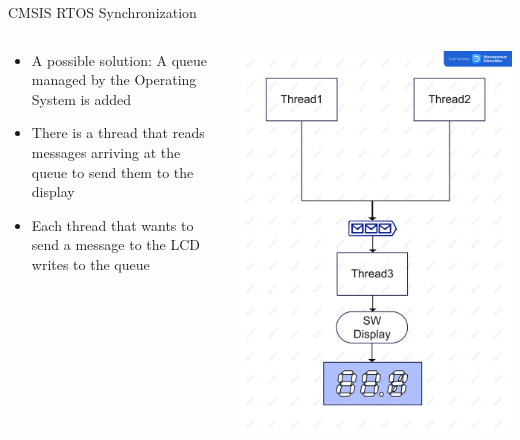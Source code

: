 \begin{frame}{CMSIS RTOS Synchronization}
    \begin{columns}
        \begin{column}{0.50\textwidth}
            \begin{itemize}
                \item A possible solution: A queue managed by the Operating System is added
                \item There is a thread that reads messages arriving at the queue to send them to the display
                \item Each thread that wants to send a message to the LCD writes to the queue
            \end{itemize}
        \end{column}
        \begin{column}{0.50\textwidth}
            \includegraphics[scale=0.05]{presentation/threads-sync.jpg}
        \end{column}
    \end{columns}
\end{frame}

